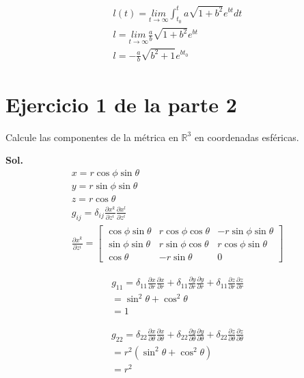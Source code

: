 \documentclass{article}
\begin{document}
\begin{gather*}
  l(t) = \underset{t \rightarrow \infty}{lim }\int_{t_0 }^{t } a \sqrt{1 + b ^2} e ^ {bt } dt \\
  l = \underset{t \rightarrow \infty}{lim }\frac{a}{b} \sqrt{1 + b ^2}  e ^ {bt }\\
  l = - \frac{a}{b} \sqrt{b ^2 + 1 }  e ^ {bt_0}
\end{gather*}

\section{Ejercicio 1 de la parte 2 }
Calcule las componentes de la métrica en $ \mathbb{R}^ {3 } $ en coordenadas esféricas.

\textbf{Sol. } 
\begin{gather*}
  x = r \cos{\phi }\sin{\theta}\\
  y = r \sin{\phi }\sin{\theta}\\
  z = r \cos{\theta}\\
  g _{ij }  = \delta _{ij } \frac{\partial x ^ {k } }{\partial z ^ {i }} \frac{\partial x ^ {l } }{\partial z ^ {i }}\\
  \frac{\partial x ^ {k } }{\partial z ^ {i }} = \begin{bmatrix}
      \cos{\phi }\sin{\theta} & r \cos{\phi }\cos{\theta} & - r \sin{\phi }\sin{\theta} \\
      \sin{\phi }\sin{\theta} & r \sin{\phi }\cos{\theta} & r \cos{\phi }\sin{\theta} \\
      \cos{\theta} & -r \sin{\theta} & 0 
  \end{bmatrix} 
\end{gather*}

\begin{gather*}
  g _{11 }  = \delta _{11 } \frac{\partial x  }{\partial r }\frac{\partial x  }{\partial r } + \delta _{11 } \frac{\partial y  }{\partial r}\frac{\partial y  }{\partial r } + \delta _{11 }  \frac{\partial z  }{\partial r} \frac{\partial z  }{\partial r }\\
  = \sin ^ {2 }{\theta } + \cos ^2{\theta }\\
  = 1
\end{gather*}

\begin{gather*}
  g _{22 }  = \delta _{22 } \frac{\partial x  }{\partial \theta }\frac{\partial x  }{\partial \theta } + \delta _{22 } \frac{\partial y  }{\partial \theta}\frac{\partial y  }{\partial \theta } + \delta _{22 }  \frac{\partial z  }{\partial \theta} \frac{\partial z  }{\partial \theta }\\
  = r ^2(\sin ^ {2 }{\theta } + \cos ^2{\theta })\\
  = r ^2
\end{gather*}
\end{document}
